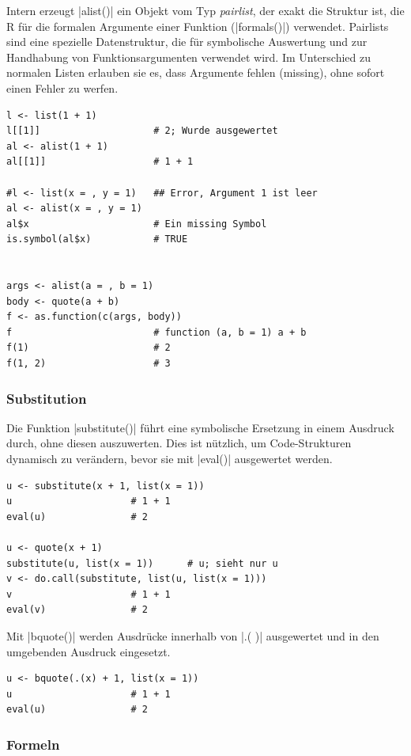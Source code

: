 \documentclass[10pt,twocolumn]{scrartcl}
\renewcommand{\lstinline}{\mycoloredinline}
\begin{document}
Intern erzeugt \lstinline|alist()| ein Objekt vom Typ \emph{pairlist}, der exakt die Struktur ist, die R für die formalen Argumente einer Funktion (\lstinline|formals()|) verwendet. Pairlists sind eine spezielle Datenstruktur, die für symbolische Auswertung und zur Handhabung von Funktionsargumenten verwendet wird. Im Unterschied zu normalen Listen erlauben sie es, dass Argumente fehlen (missing), ohne sofort einen Fehler zu werfen.

\begin{lstlisting}
l <- list(1 + 1)
l[[1]]                    # 2; Wurde ausgewertet
al <- alist(1 + 1)
al[[1]]                   # 1 + 1

#l <- list(x = , y = 1)   ## Error, Argument 1 ist leer
al <- alist(x = , y = 1)
al$x                      # Ein missing Symbol
is.symbol(al$x)           # TRUE


args <- alist(a = , b = 1)
body <- quote(a + b)
f <- as.function(c(args, body))
f                         # function (a, b = 1) a + b
f(1)                      # 2
f(1, 2)                   # 3
\end{lstlisting}


\subsubsection{Substitution}

Die Funktion \lstinline|substitute()| führt eine symbolische Ersetzung in einem Ausdruck durch, ohne diesen auszuwerten. Dies ist nützlich, um Code-Strukturen dynamisch zu verändern, bevor sie mit \lstinline|eval()| ausgewertet werden.

\begin{lstlisting}
u <- substitute(x + 1, list(x = 1))
u                     # 1 + 1
eval(u)               # 2

u <- quote(x + 1)
substitute(u, list(x = 1))      # u; sieht nur u
v <- do.call(substitute, list(u, list(x = 1)))
v                     # 1 + 1
eval(v)               # 2
\end{lstlisting}

Mit \lstinline|bquote()| werden Ausdrücke innerhalb von \lstinline|.( )| ausgewertet und in den umgebenden Ausdruck eingesetzt.

\begin{lstlisting}
u <- bquote(.(x) + 1, list(x = 1))
u                     # 1 + 1
eval(u)               # 2
\end{lstlisting}


\subsubsection{Formeln}
\label{ssec:formula}
\end{document}
